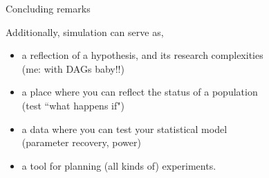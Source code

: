 %
%
\begin{lhframe}[rhgraphic={\texttt{[image: think2.jpg]}}]
	{Concluding remarks}
	
	Additionally, simulation can serve as,
	\begin{itemize}
		\item a reflection of a hypothesis, and its research complexities\\
		{\small (me: with DAGs baby!!)}
		\item a place where you can reflect the status of a population \\
		{\small (test ``what happens if") }
		\item a data where you can test your statistical model \\
		{\small (parameter recovery, power) }
		\item a tool for planning (all kinds of) experiments.
	\end{itemize} 
\end{lhframe}
%
%